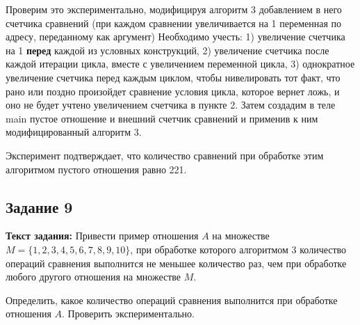 \documentclass[12pt]{article}
\begin{document}
	Проверим это экспериментально, модифицируя алгоритм 3 добавлением в него счетчика сравнений (при каждом сравнении увеличивается на 1 переменная по адресу, переданному как аргумент) Необходимо учесть: 1) увеличение счетчика на 1 {\bf перед} каждой из условных конструкций, 2) увеличение счетчика после каждой итерации цикла, вместе с увеличением переменной цикла, 3) однократное увеличение счетчика перед каждым циклом, чтобы нивелировать тот факт, что рано или поздно произойдет сравнение условия цикла, которое вернет ложь, и оно не будет учтено увеличением счетчика в пункте 2. Затем создадим в теле main пустое отношение и внешний счетчик сравнений и применив к ним модифицированный алгоритм 3.
	
	 
	
	\begin{figure}[h]
		\noindent{}
	\end{figure}
	
	Эксперимент подтверждает, что количество сравнений при обработке этим алгоритмом пустого отношения равно 221.
	
	\subsection{Задание 9}
	\label{task9}
	{\bf Текст задания:} Привести пример отношения $A$ на множестве $M = \{1, 2, 3, 4, 5, 6, 7, 8, 9, 10\}$, при обработке которого алгоритмом 3 количество операций сравнения выполнится не меньшее количество раз, чем при обработке любого другого отношения на множестве $M$.

	Определить, какое количество операций сравнения выполнится при обработке отношения $A$. Проверить экспериментально.
	
\end{document}
